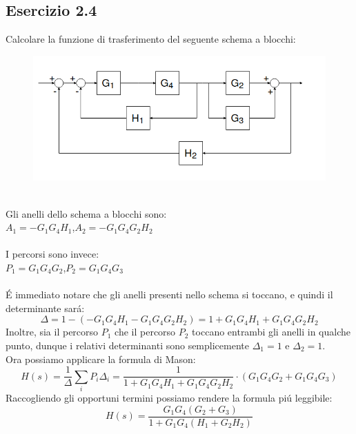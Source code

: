 \documentclass[12pt,a4paper]{article}
\begin{document}
	\subsection*{Esercizio 2.4}
	Calcolare la funzione di trasferimento del seguente schema a blocchi:
	\begin{figure}[h!]
		\centering
		\includegraphics[scale=0.5]{./images/schema24.png}
	\end{figure}
	\\
	Gli anelli dello schema a blocchi sono:\\
	$A_1 = -G_1G_4H_1$,\quad$A_2 = -G_1G_4G_2H_2$\\ \\
	I percorsi sono invece:\\
	$P_1 = G_1G_4G_2$,\quad$P_2 = G_1G_4G_3$\\ \\
	\'E immediato notare che gli anelli presenti nello schema si toccano, e quindi il determinante sar\'a:
	\[
		\Delta = 1 - (-G_1G_4H_1 - G_1G_4G_2H_2) = 1 +G_1G_4H_1 + G_1G_4G_2H_2
	\]
	Inoltre, sia il percorso $P_1$ che il percorso $P_2$ toccano entrambi gli anelli in qualche punto, dunque i relativi determinanti sono semplicemente $\Delta_1 = 1$ e $\Delta_2 = 1$.\\
	Ora possiamo applicare la formula di Mason:
	\[
		H(s) = \frac{1}{\Delta}\sum_i P_i \Delta_i = \frac{1}{1 +G_1G_4H_1 + G_1G_4G_2H_2} \cdot \left(G_1G_4G_2 + G_1G_4G_3\right)
	\]
	Raccogliendo gli opportuni termini possiamo rendere la formula pi\'u leggibile:
	\[
		H(s) = \frac{G_1G_4(G_2+G_3)}{1+G_1G_4(H_1+G_2H_2)}
	\]
	\newpage
\end{document}
